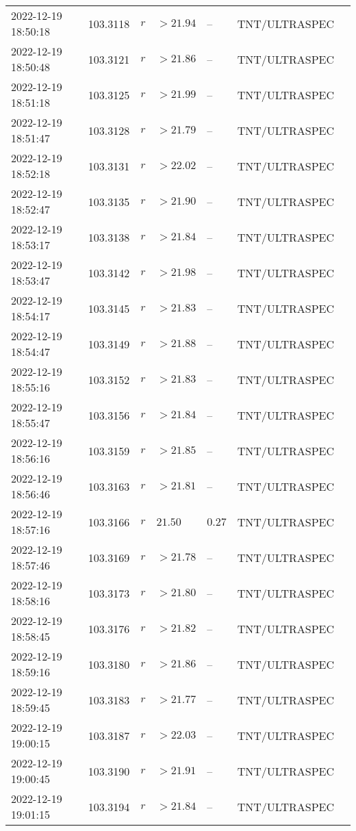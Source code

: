 \documentclass{nature_plusfigure}
\begin{document}
\begin{supplement}
\begin{center}
\begin{longtable}{lllllll}
2022-12-19 18:50:18 & 103.3118 & $r$ & $>21.94$ & -- & TNT/ULTRASPEC &  \\ 
2022-12-19 18:50:48 & 103.3121 & $r$ & $>21.86$ & -- & TNT/ULTRASPEC &  \\ 
2022-12-19 18:51:18 & 103.3125 & $r$ & $>21.99$ & -- & TNT/ULTRASPEC &  \\ 
2022-12-19 18:51:47 & 103.3128 & $r$ & $>21.79$ & -- & TNT/ULTRASPEC &  \\ 
2022-12-19 18:52:18 & 103.3131 & $r$ & $>22.02$ & -- & TNT/ULTRASPEC &  \\ 
2022-12-19 18:52:47 & 103.3135 & $r$ & $>21.90$ & -- & TNT/ULTRASPEC &  \\ 
2022-12-19 18:53:17 & 103.3138 & $r$ & $>21.84$ & -- & TNT/ULTRASPEC &  \\ 
2022-12-19 18:53:47 & 103.3142 & $r$ & $>21.98$ & -- & TNT/ULTRASPEC &  \\ 
2022-12-19 18:54:17 & 103.3145 & $r$ & $>21.83$ & -- & TNT/ULTRASPEC &  \\ 
2022-12-19 18:54:47 & 103.3149 & $r$ & $>21.88$ & -- & TNT/ULTRASPEC &  \\ 
2022-12-19 18:55:16 & 103.3152 & $r$ & $>21.83$ & -- & TNT/ULTRASPEC &  \\ 
2022-12-19 18:55:47 & 103.3156 & $r$ & $>21.84$ & -- & TNT/ULTRASPEC &  \\ 
2022-12-19 18:56:16 & 103.3159 & $r$ & $>21.85$ & -- & TNT/ULTRASPEC &  \\ 
2022-12-19 18:56:46 & 103.3163 & $r$ & $>21.81$ & -- & TNT/ULTRASPEC &  \\ 
2022-12-19 18:57:16 & 103.3166 & $r$ & $21.50$ & $0.27$ & TNT/ULTRASPEC &  \\ 
2022-12-19 18:57:46 & 103.3169 & $r$ & $>21.78$ & -- & TNT/ULTRASPEC &  \\ 
2022-12-19 18:58:16 & 103.3173 & $r$ & $>21.80$ & -- & TNT/ULTRASPEC &  \\ 
2022-12-19 18:58:45 & 103.3176 & $r$ & $>21.82$ & -- & TNT/ULTRASPEC &  \\ 
2022-12-19 18:59:16 & 103.3180 & $r$ & $>21.86$ & -- & TNT/ULTRASPEC &  \\ 
2022-12-19 18:59:45 & 103.3183 & $r$ & $>21.77$ & -- & TNT/ULTRASPEC &  \\ 
2022-12-19 19:00:15 & 103.3187 & $r$ & $>22.03$ & -- & TNT/ULTRASPEC &  \\ 
2022-12-19 19:00:45 & 103.3190 & $r$ & $>21.91$ & -- & TNT/ULTRASPEC &  \\ 
2022-12-19 19:01:15 & 103.3194 & $r$ & $>21.84$ & -- & TNT/ULTRASPEC &  \\ 

\end{longtable}
\end{center}
\end{supplement}
\end{document}

